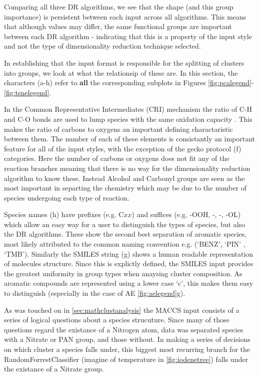 Comparing all three DR algorithms, we see that the shape (and this group importance) is persistent between each input across all algorithms. This means that although values may differ, the same functional groups are important between each DR algorithm - indicating that this is a property of the input style and not the type of dimensionality reduction technique selected.

In establishing that the input format is responsible for the splitting of clusters into groups, we look at what the relationsip of these are. In this section, the characters (a-h) refer to \textbf{all} the corresponding subplots in Figures \ref{fig:pcalegend}-\ref{fig:tsnelegend}.

 In the Common Representative Intermediates (CRI) mechanism the ratio of C-H and C-O bonds are used to lump species with the same oxidation capacity \citep{cri}. This makes the ratio of carbons to oxygens an important defining charactaristic between them. The number of each of these elements is consistantly an important feature for all of the input styles, with the exception of the gecko protocol (f) categories. Here the number of carbons or oxygens does not fit any of the reaction branches meaning that there is no way for the dimensionality reduction algorithm to know these. Instead Alcohol and Carbonyl groups are seen as the most important in separting the chemistry which may be due to the number of species undergoing each type of reaction.

 Species names (h) have prefixes (e.g. C$xx$) and suffices (e.g. -OOH, -, -, -OL) which allow an easy way for a user to distinguish the types of species, but also the DR algorithms. These show the second best separation of aromatic species, most likely attributed to the common naming convention e.g. (`BENZ', `PIN' , `TMB'). Similarly the SMILES string (g) shows a human readable representation of molecules structure. Since this is explictly defined, the SMILES input provides the greatest uniformity in group types when anaysing cluster composition. As aromatic compounds are represented using a lower case `c', this makes them easy to distinguish (especially in the case of AE \autoref{fig:aelegend}g).

 As was touched on  in \autoref{sec:mathclustanalysis} the MACCS input consists of a series of logical questions about a species strucuture. Since many of those questions regard the existance of a Nitrogen atom, data was separated species with a Nitrate or PAN group, and those without. In making a series of decisions on which cluster a species falls under, this biggest most recurring branch for the RandomForrestClassifier (imagine of temperature in \autoref{fig:iodenetree}) falls under the existance of a Nitrate group.

